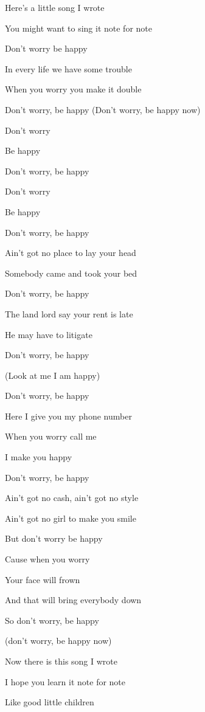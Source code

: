 

\zs 
Here's a little song I wrote 

You might want to sing it note for note 

Don't worry be happy 

In every life we have some trouble

When you worry you make it double 

Don't worry, be happy (Don't worry, be happy now)
\ks

\zr
Don't worry 

Be happy

Don't worry, be happy

Don't worry

Be happy

Don't worry, be happy
\kr

\zs
Ain't got no place to lay your head 

Somebody came and took your bed

Don't worry, be happy 

The land lord say your rent is late 

He may have to litigate 

Don't worry, be happy 

(Look at me I am happy)
\ks

\zr
Don't worry, be happy 

Here I give you my phone number 

When you worry call me

I make you happy 

Don't worry, be happy 
\kr

\zs
Ain't got no cash, ain't got no style 

Ain't got no girl to make you smile 

But don't worry be happy

Cause when you worry 

Your face will frown 

And that will bring everybody down 

So don't worry, be happy 

(don't worry, be happy now)
\ks

\zr
\kr

\zs
Now there is this song I wrote 

I hope you learn it note for note 

Like good little children 

